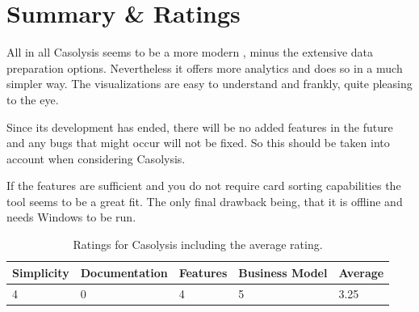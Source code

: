 \section{Summary \& Ratings}
All in all Casolysis seems to be a more modern \textcite{SynCaps},
minus the extensive data preparation options. Nevertheless it offers
more analytics and does so in a much simpler way. The visualizations
are easy to understand and frankly, quite pleasing to the eye.

Since its development has ended, there will be no added features in
the future and any bugs that might occur will not be fixed. So this
should be taken into account when considering Casolysis.

If the features are sufficient and you do not require card sorting
capabilities the tool seems to be a great fit. The only final drawback
being, that it is offline and needs Windows to be run.


\begin{table}[tp] 
\centering 
\begin{tabularx}{\linewidth}{|X|X|X|X|X|}
\hline
Simplicity & Documentation & Features & Business Model & Average \\ 
\hline 
4 & 0 & 4 & 5 & 3.25 \\ 
\hline 
\end{tabularx} 
\caption[Ratings for Casolysis] {
Ratings for Casolysis including the average rating.
} 
\label{tab:rating-Casolysis}




\end{table}